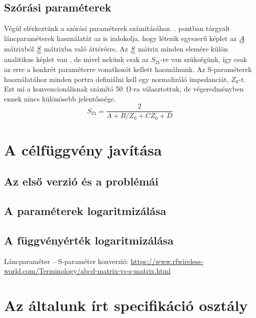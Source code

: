 	\subsection{Szórási paraméterek}
        Végül elérkeztünk a szórási paraméterek számításához. . pontban tárgyalt láncparaméterek használatát az is indokolja, hogy létezik egyszerű képlet az $\underline{\underline{A}}$ mátrixból $\underline{\underline{S}}$ mátrixba való áttérésre. Az $\underline{\underline{S}}$ mátrix minden elemére külön analitikus képlet van \cite{lancpar_spar}, de mivel nekünk csak az $S_{21}$-re van szükségünk, így csak az erre a konkrét paraméterre vonatkozót kellett használnunk. Az S-paraméterek használatához minden portra definiálni kell egy normalizáló impedanciát, $Z_0$-t. Ezt mi a konvencionálisnak számító \qty{50}{\ohm}-ra választottuk, de végeredményben ennek nincs különösebb jelentőssége. 
    \begin{equation}
        S_{21} = \dfrac{2}{A+B/Z_0+CZ_0+D}
    \end{equation}
\section{A célfüggvény javítása}
    \label{sec:celfuggveny_javitas}
	\subsection{Az első verzió és a problémái}
	\subsection{A paraméterek logaritmizálása}
	\subsection{A függvényérték logaritmizálása}

\begin{thebibliography}{1}
     Láncparaméter -- S-paraméter konverzió: \url{https://www.rfwireless-world.com/Terminology/abcd-matrix-vs-s-matrix.html}
\end{thebibliography}

\clearpage
\appendix
\section{Az általunk írt specifikáció osztály}
	

